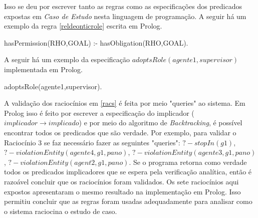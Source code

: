 Isso se deu por escrever tanto as regras como as especificações dos predicados expostas em \textit{Caso de Estudo} nesta linguagem de programação. A seguir há um exemplo da regra \ref{reldeonticrole} escrita em Prolog.

hasPermission(RHO,GOAL) :- hasObligation(RHO,GOAL).

A seguir há um exemplo da especificação $adoptsRole(agente1,supervisor)$ implementada em Prolog.

adoptsRole(agente1,supervisor).

A validação dos raciocínios em \ref{racs} é feita por meio "queries" ao sistema. Em Prolog isso é feito por escrever a especificação do implicador ($implicador \to implicado$) e por meio do algoritmo de \textit{Backtracking}, é possível encontrar todos os predicados que são verdade. Por exemplo, para validar o Raciocínio 3 se faz necessário fazer as seguintes "queries": $? - stopIn(g1)$, $? - violationEntity(agente4,g1,pano)$, $? - violationEntity(agente3,g1,pano)$, $? - violationEntity(agent2,g1,pano)$. Se o programa retorna como verdade todos os predicados implicadores que se espera pela verificação analítica, então é razoável concluir que os raciocínios foram validados. Os sete raciocínios aqui expostos apresentaram o mesmo resultado na implementação em Prolog. Isso permitiu concluir que as regras foram usadas adequadamente para analisar como o sistema raciocina o estudo de caso. 